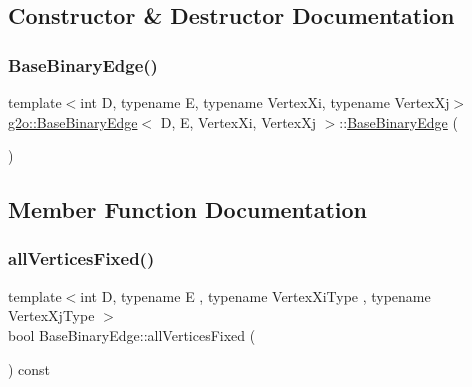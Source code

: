 \subsection{Constructor \& Destructor Documentation}
\mbox{\label{classg2o_1_1_base_binary_edge_aacfc6e1d439f2f0fb09c6b069f478cf4}} 
\subsubsection{\texorpdfstring{Base\+Binary\+Edge()}{BaseBinaryEdge()}}
{\footnotesize\ttfamily template$<$int D, typename E, typename Vertex\+Xi, typename Vertex\+Xj$>$ \\
\mbox{\hyperlink{classg2o_1_1_base_binary_edge}{g2o\+::\+Base\+Binary\+Edge}}$<$ D, E, Vertex\+Xi, Vertex\+Xj $>$\+::\mbox{\hyperlink{classg2o_1_1_base_binary_edge}{Base\+Binary\+Edge}} (\begin{DoxyParamCaption}{ }\end{DoxyParamCaption})\hspace{0.3cm}{\ttfamily [inline]}}



\subsection{Member Function Documentation}
\mbox{\label{classg2o_1_1_base_binary_edge_adc9ce883a63aa7bdba86e552d72e1de9}} 
\subsubsection{\texorpdfstring{all\+Vertices\+Fixed()}{allVerticesFixed()}}
{\footnotesize\ttfamily template$<$int D, typename E , typename Vertex\+Xi\+Type , typename Vertex\+Xj\+Type $>$ \\
bool Base\+Binary\+Edge\+::all\+Vertices\+Fixed (\begin{DoxyParamCaption}{ }\end{DoxyParamCaption}) const\hspace{0.3cm}{\ttfamily [virtual]}}



